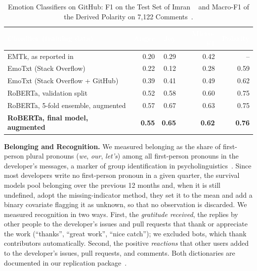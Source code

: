 \begin{table}[t]
\centering
\caption{Emotion Classifiers on GitHub: F1 on the Test Set of Imran \etal~\cite{imran2022data} and Macro-F1 of the Derived Polarity on 7,122 Comments~\cite{novielli2020can}.}
\label{tab:emotions}
\setlength{\tabcolsep}{3pt}
\scriptsize
\begin{tabularx}{\columnwidth}{>{\raggedright\arraybackslash}X r r r r}
\toprule
\rowcolor{arsenic}
\textcolor{white}{\textbf{Classifier (training data)}} & \textcolor{white}{\textbf{Anger}} & \textcolor{white}{\textbf{Joy}} & \textcolor{white}{\textbf{Micro-F1}} & \textcolor{white}{\textbf{Polarity}} \\
\midrule
EMTk, as reported in~\cite{imran2022data} & 0.20 & 0.29 & 0.42 & -- \\
\rowcolor{gray!8}
EmoTxt (Stack Overflow) & 0.22 & 0.12 & 0.28 & 0.59 \\
EmoTxt (Stack Overflow + GitHub) & 0.39 & 0.41 & 0.49 & 0.62 \\
\rowcolor{gray!8}
RoBERTa, validation split & 0.52 & 0.58 & 0.60 & 0.75 \\
RoBERTa, 5-fold ensemble, augmented & 0.57 & 0.67 & 0.63 & 0.75 \\
\rowcolor{gray!8}
\textbf{RoBERTa, final model, augmented} & \textbf{0.55} & \textbf{0.65} & \textbf{0.62} & \textbf{0.76} \\
\bottomrule
\end{tabularx}
\end{table}

\textbf{Belonging and Recognition.} We measured belonging as the share of first-person plural pronouns (\eg \textit{we}, \textit{our}, \textit{let's}) among all first-person pronouns in the developer's messages, a marker of group identification in psycholinguistics~\cite{tausczik2010psychological}. Since most developers write no first-person pronoun in a given quarter, the survival models pool belonging over the previous 12 months and, when it is still undefined, adopt the missing-indicator method, \ie they set it to the mean and add a binary covariate flagging it as unknown, so that no observation is discarded. We measured recognition in two ways. First, the \textit{gratitude received}, \ie the replies by other people to the developer's issues and pull requests that thank or appreciate the work (\eg ``thanks'', ``great work'', ``nice catch''); we excluded bots, which thank contributors automatically. Second, the positive \textit{reactions} that other users added to the developer's issues, pull requests, and comments. Both dictionaries are documented in our replication package~\cite{replication}.

